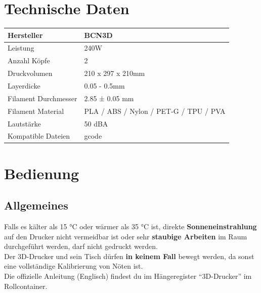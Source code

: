 \documentclass[a4paper]{article}
\begin{document}
\section{Technische Daten}
 \begin{tabular}{|l|l|}
 	\hline
 	Hersteller & BCN3D\\
 	\hline
 	Leistung & 240W \\
 	\hline
 	Anzahl Köpfe & 2 \\
 	\hline
	Druckvolumen &  210 x 297 x 210mm\\
	\hline
	Layerdicke & 0.05 - 0.5mm\\
	\hline
	Filament Durchmesser & 2.85 ± 0.05 mm\\
	\hline
	Filament Material & PLA / ABS / Nylon / PET-G / TPU / PVA\\
	\hline
	Lautstärke & 50 dBA\\
	\hline
	Kompatible Dateien & gcode \\
	\hline
\end{tabular}
\newpage
\section{Bedienung}
\subsection{Allgemeines}
Falls es kälter als 15 °C oder wärmer als 35 °C ist, direkte \textbf{Sonneneinstrahlung} auf den Drucker nicht vermeidbar ist oder sehr \textbf{staubige Arbeiten} im Raum durchgeführt werden, darf nicht gedruckt werden.\\
Der 3D-Drucker und sein Tisch dürfen \textbf{in keinem Fall} bewegt werden, da sonst eine vollständige Kalibrierung von Nöten ist.\\
Die offizielle Anleitung (Englisch) findest du im Hängeregister "`3D-Drucker"' im Rollcontainer.
\end{document}
